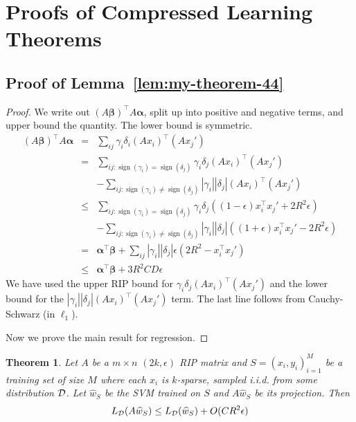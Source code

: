 \documentclass[english]{article}
\theoremstyle{plain}
\newtheorem{theorem}{Theorem}
\DeclareMathOperator{\sign}{sign}
\begin{document}



\appendix
\section{Proofs of Compressed Learning Theorems}

\subsection{Proof of Lemma~\ref{lem:my-theorem-44}}
\label{app:my-theorem-44-proof}

\begin{proof}
We write out $\left(A\bm{\beta}\right)^{\top}A\bm{\alpha}$, split
up into positive and negative terms, and upper bound the quantity.
The lower bound is symmetric.
\begin{eqnarray*}
\left(A\bm{\beta}\right)^{\top}A\bm{\alpha} & = & \sum_{ij}\gamma_{i}\delta_{i}\left(Ax_{i}\right)^{\top}\left(Ax_{j}'\right)\\
 & = & \sum_{ij:\sign(\gamma_{i})=\sign(\delta_{j})}\gamma_{i}\delta_{j}\left(Ax_{i}\right)^{\top}\left(Ax_{j}'\right)\\
 &  & -\sum_{ij:\sign(\gamma_{i})\neq\sign(\delta_{j})}\left|\gamma_{i}\right|\left|\delta_{j}\right|\left(Ax_{i}\right)^{\top}\left(Ax_{j}'\right)\\
 & \leq & \sum_{ij:\sign(\gamma_{i})=\sign(\delta_{j})}\gamma_{i}\delta_{j}\left((1-\epsilon)x_{i}^{\top}x_{j}'+2R^{2}\epsilon\right)\\
 &  & -\sum_{ij:\sign(\gamma_{i})\neq\sign(\delta_{j})}\left|\gamma_{i}\right|\left|\delta_{j}\right|\left((1+\epsilon)x_{i}^{\top}x_{j}'-2R^{2}\epsilon\right)\\
 & = & \bm{\alpha}^{\top}\bm{\beta}+\sum_{ij}\left|\gamma_{i}\right|\left|\delta_{j}\right|\epsilon\left(2R^{2}-x_{i}^{\top}x_{j}'\right)\\
 & \leq & \bm{\alpha}^{\top}\bm{\beta}+3R^{2}CD\epsilon
\end{eqnarray*}
We have used the upper RIP bound for $\gamma_{i}\delta_{j}\left(Ax_{i}\right)^{\top}\left(Ax_{j}'\right)$
and the lower bound for the $\left|\gamma_{i}\right|\left|\delta_{j}\right|\left(Ax_{i}\right)^{\top}\left(Ax_{j}'\right)$
term. The last line follows from Cauchy-Schwarz (in $\ell_{1}$).

Now we prove the main result for regression.
\end{proof}
\begin{theorem}
\label{thm:regression}
Let $A$ be a $m \times n$ $(2k, \epsilon)$ RIP matrix and $S = {(x_i,y_i)_{i=1}^M}$ be a training set of size $M$ where each $x_i$ is $k$-sparse, sampled i.i.d. from some distribution $\cal D$. Let $\widehat{w}_S$ be the SVM trained on $S$ and $A\widehat{w}_S$ be its projection. Then
\[
L_{\cal D}(A\widehat{w}_S) \leq L_{\cal D}(\widehat{w}_S) + O(CR^2 \epsilon)
\]
\end{theorem}
\end{document}
